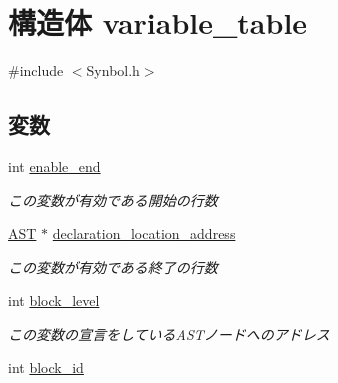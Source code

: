 \hypertarget{structvariable__table}{
\section{構造体 variable\_\-table}
\label{structvariable__table}
}


{\ttfamily \#include $<$Synbol.h$>$}

\subsection*{変数}
\begin{DoxyCompactItemize}
\item 
\hypertarget{structvariable__table_a69b24ee97fe37831cbfe54edf6c5a9c0}{
int \hyperlink{structvariable__table_a69b24ee97fe37831cbfe54edf6c5a9c0}{enable\_\-end}}
\label{structvariable__table_a69b24ee97fe37831cbfe54edf6c5a9c0}

\begin{DoxyCompactList}\small\item\em この変数が有効である開始の行数 \item\end{DoxyCompactList}\item 
\hypertarget{structvariable__table_ad4eca9a1daf1ccf260a672768a054d73}{
\hyperlink{structabstract__syntax__tree}{AST} $\ast$ \hyperlink{structvariable__table_ad4eca9a1daf1ccf260a672768a054d73}{declaration\_\-location\_\-address}}
\label{structvariable__table_ad4eca9a1daf1ccf260a672768a054d73}

\begin{DoxyCompactList}\small\item\em この変数が有効である終了の行数 \item\end{DoxyCompactList}\item 
\hypertarget{structvariable__table_a7dfd4036a14e108dda08ce0bd83e7fe1}{
int \hyperlink{structvariable__table_a7dfd4036a14e108dda08ce0bd83e7fe1}{block\_\-level}}
\label{structvariable__table_a7dfd4036a14e108dda08ce0bd83e7fe1}

\begin{DoxyCompactList}\small\item\em この変数の宣言をしているASTノードへのアドレス \item\end{DoxyCompactList}\item 
\hypertarget{structvariable__table_a689fe54448fbbc46aaebb56203005cc4}{
int \hyperlink{structvariable__table_a689fe54448fbbc46aaebb56203005cc4}{block\_\-id}}
\label{structvariable__table_a689fe54448fbbc46aaebb56203005cc4}


\end{DoxyCompactItemize}

